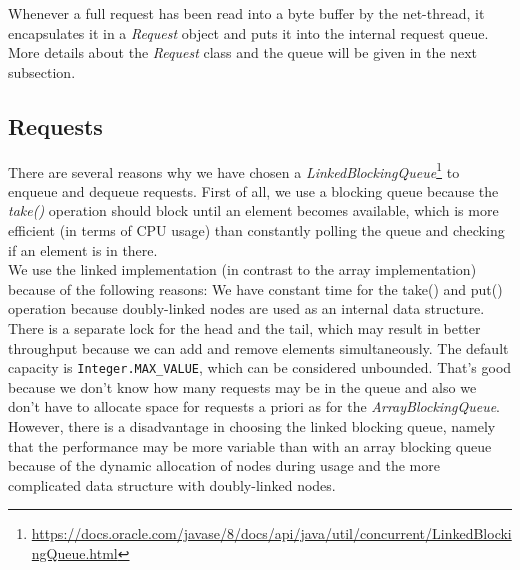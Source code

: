 Whenever a full request has been read into a byte buffer by the net-thread, it encapsulates it in a \textit{Request} object and puts it into the internal request queue. More details about the \textit{Request} class and the queue will be given in the next subsection. 

\subsection{Requests}
There are several reasons why we have chosen a \textit{LinkedBlockingQueue}\footnote{\url{https://docs.oracle.com/javase/8/docs/api/java/util/concurrent/LinkedBlockingQueue.html}} to enqueue and dequeue requests. First of all, we use a blocking queue because the \textit{take()} operation should block until an element becomes available, which is more efficient (in terms of CPU usage) than constantly polling the queue and checking if an element is in there. \\
We use the linked implementation (in contrast to the array implementation) because of the following reasons: We have constant time for the take() and put() operation because doubly-linked nodes are used as an internal data structure. There is a separate lock for the head and the tail, which may result in better throughput because we can add and remove elements simultaneously. The default capacity is \texttt{Integer.MAX_VALUE}, which can be considered unbounded. That's good because we don't know how many requests may be in the queue and also we don't have to allocate space for requests a priori as for the \textit{ArrayBlockingQueue}. \\
However, there is a disadvantage in choosing the linked blocking queue, namely that the performance may be more variable than with an array blocking queue because of the dynamic allocation of nodes during usage and the more complicated data structure with doubly-linked nodes. \\

